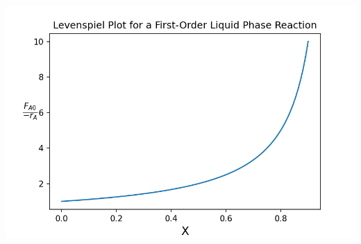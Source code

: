 \documentclass[12pt]{article}
\begin{document}
\begin{enumerate}
    \includegraphics{CHEN364_HW2_P2_fig.png}



\end{enumerate}
\end{document}
